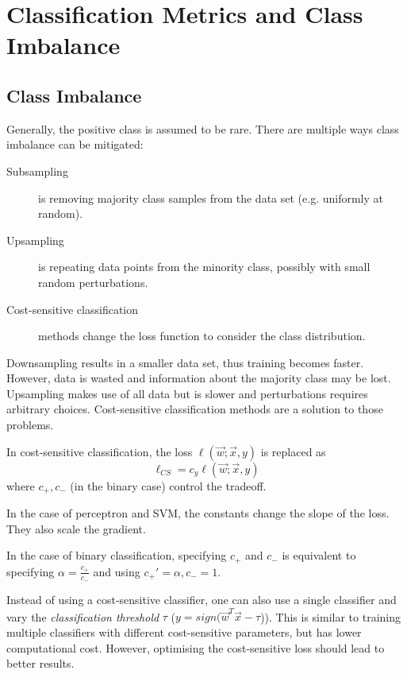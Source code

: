 \section{Classification Metrics and Class Imbalance}

\subsection{Class Imbalance}
Generally, the positive class is assumed to be rare.
There are multiple ways class imbalance can be mitigated:

\begin{description}
    \item[Subsampling] is removing majority class samples
    from the data set (e.g. uniformly at random).
    \item[Upsampling] is repeating data points from the
    minority class, possibly with small random perturbations.
    \item[Cost-sensitive classification] methods change
    the loss function to consider the class distribution.
\end{description}

Downsampling results in a smaller data set, thus training
becomes faster. However, data is wasted and information about
the majority class may be lost.
Upsampling makes use of all data but is slower and
perturbations requires arbitrary choices.
Cost-sensitive classification methods are a solution
to those problems.

In cost-sensitive classification,
the loss $\ell(\vec{w}; \vec{x}, y)$ is replaced as
\begin{equation*}
    \ell_{CS} = c_y \ell(\vec{w}; \vec{x}, y)
\end{equation*}
where $c_{+}, c_{-}$ (in the binary case) control the tradeoff.

In the case of perceptron and SVM, the constants change the
slope of the loss.
They also scale the gradient.

In the case of binary classification, specifying
$c_{+}$ and $c_{-}$ is equivalent to specifying
$\alpha = \frac{c_{+}}{c_{-}}$ and using
$c_{+}' = \alpha, c_{-} = 1$.

Instead of using a cost-sensitive classifier,
one can also use a single classifier and vary the
\emph{classification threshold} $\tau$
($y = sign(\vec{w}^T \vec{x} - \tau$)).
This is similar to training multiple classifiers with
different cost-sensitive parameters, but has lower
computational cost.
However, optimising the cost-sensitive loss should lead to better results.



